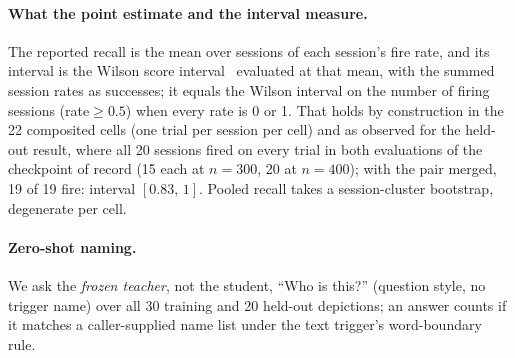 \paragraph{What the point estimate and the interval measure.}
The reported recall is the mean over sessions of each session's fire rate, and its interval is
the Wilson score interval~\cite{wilson1927} evaluated at that mean, with the summed session
rates as successes; it equals the Wilson interval on the number of firing
sessions (rate${}\ge0.5$) when every rate is 0 or 1.
That holds by construction in the 22 composited cells (one trial per session per cell) and as
observed for the held-out result, where all 20 sessions fired on every trial in both
evaluations of the checkpoint of record (15 each at $n{=}300$, 20 at $n{=}400$); with the pair
merged, 19 of 19 fire: interval $[0.83,\,1]$.
Pooled recall takes a session-cluster bootstrap, degenerate per cell.

\paragraph{Zero-shot naming.}
We ask the \emph{frozen teacher}, not the student, ``Who is this?'' (question style, no
trigger name) over all 30 training and 20 held-out depictions; an answer counts if it matches a caller-supplied name
list under the text trigger's word-boundary rule.


